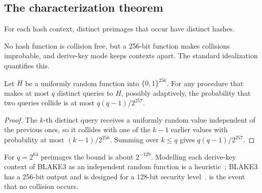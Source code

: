 \subsection{The characterization theorem}

\begin{assumption}\label{ass:cr}
For each hash context, distinct preimages that occur have distinct hashes.
\end{assumption}

No hash function is collision free, but a 256-bit function makes collisions improbable, and
derive-key mode keeps contexts apart. The standard idealization quantifies this.

\begin{lemma}\label{lem:birthday}
Let $H$ be a uniformly random function into $\{0,1\}^{256}$. For any procedure that makes at
most $q$ distinct queries to $H$, possibly adaptively, the probability that two queries
collide is at most $q(q-1)/2^{257}$.
\end{lemma}
\begin{proof}
The $k$-th distinct query receives a uniformly random value independent of the previous ones,
so it collides with one of the $k-1$ earlier values with probability at most
$(k-1)/2^{256}$. Summing over $k\le q$ gives $q(q-1)/2^{257}$.
\end{proof}

For $q=2^{64}$ preimages the bound is about $2^{-129}$. Modelling each derive-key context of
BLAKE3 as an independent random function is a heuristic~\cite{bellare1993random}; BLAKE3 has a
256-bit output and is designed for a 128-bit security level~\cite{blake3}.
 is the event that no collision occurs.

